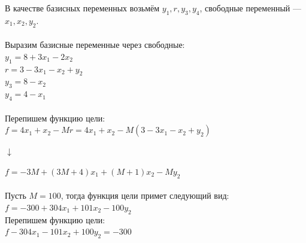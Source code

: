 \documentclass[14pt,a4paper,fleqn]{extarticle}
\begin{document}
В качестве базисных переменных возьмём $y_1, r, y_3, y_4$, свободные переменный --- $x_1, x_2, y_2$.\\\\
Выразим базисные переменные через свободные:\\
$y_1 = 8 + 3x_1 - 2x_2 $\\
$r = 3 - 3x_1 - x_2 + y_2$\\
$y_3 = 8 - x_2$\\
$y_4 = 4 - x_1$\\\\
Перепишем функцию цели:\\
$f = 4x_1 + x_2 - Mr = 4x_1 + x_2 - M(3 - 3x_1 - x_2 + y_2)$
\begin{center}$\downarrow$\end{center}
$f = -3M + (3M + 4)x_1 + (M + 1)x_2 - My_2$\\\\
Пусть $M = 100$, тогда функция цели примет следующий вид:\\
$f = -300 + 304x_1 + 101x_2 - 100y_2$\\

Перепишем функцию цели:\\
$f - 304x_1 - 101x_2 + 100y_2 = -300$
\newpage
\end{document}
